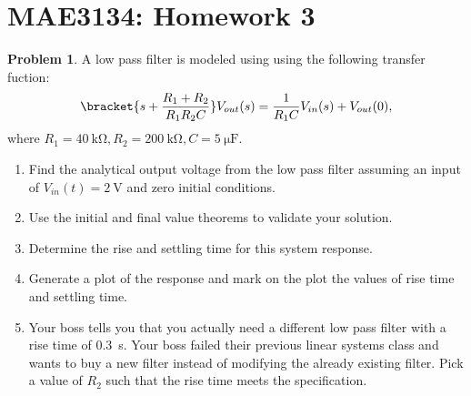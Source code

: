 \documentclass[10pt]{article}
\date{}
\theoremstyle{definition}
\newtheorem{prob}{Problem}[section]
\newenvironment{subprob}%
{\renewcommand{\theenumi}{\alph{enumi}}\renewcommand{\labelenumi}{(\theenumi)}\begin{enumerate}}%
{\end{enumerate}}%
\begin{document}
\pagestyle{empty}
\section*{MAE3134: Homework 3}
\vspace*{-0.4cm}

\begin{prob}
    A low pass filter is modeled using using the following transfer fuction:
    \begin{align}
        \bracket{s + \frac{R_1 + R_2}{R_1 R_2 C}} V_{out}(s) = \frac{1}{R_1 C} V_{in}(s) + V_{out}(0), 
    \end{align}
    where \( R_1 = \SI{40}{\kilo\ohm}, R_2 = \SI{200}{\kilo\ohm}, C = \SI{5}{\micro\farad}\).

    \begin{subprob}
        \item Find the analytical output voltage from the low pass filter assuming an input of \( V_{in}(t) = \SI{2}{\volt}\) and zero initial conditions.
        \item Use the initial and final value theorems to validate your solution.
        \item Determine the rise and settling time for this system response.
        \item Generate a plot of the response and mark on the plot the values of rise time and settling time.
    \item Your boss tells you that you actually need a different low pass filter with a rise time of \SI{0.3}{\second}.
        Your boss failed their previous linear systems class and wants to buy a new filter instead of modifying the already existing filter.
        Pick a value of \( R_2\) such that the rise time meets the specification.
    \end{subprob}
\end{prob}
\end{document}
